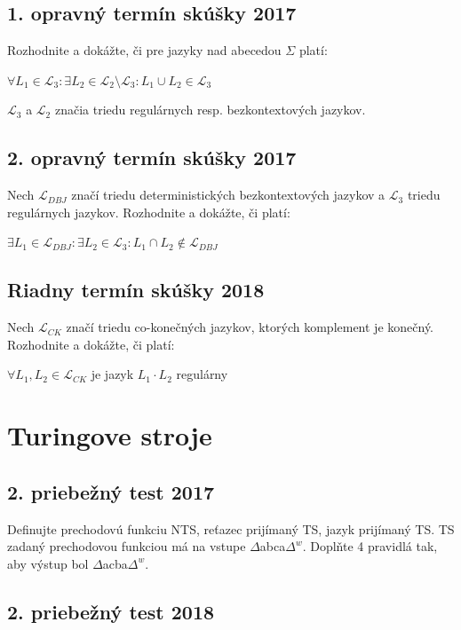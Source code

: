 \documentclass[11pt,a4paper]{article}
\begin{document}
		\subsection{1. opravný termín skúšky 2017}

		Rozhodnite a dokážte, či pre jazyky nad abecedou $\Sigma$ platí:

		$\forall L_1 \in \mathcal{L}_3: \exists L_2 \in \mathcal{L}_2 \setminus \mathcal{L}_3: L_1 \cup L_2 \in \mathcal{L}_3$

		$\mathcal{L}_3$ a $\mathcal{L}_2$ značia triedu regulárnych resp. bezkontextových jazykov.

		\subsection{2. opravný termín skúšky 2017}

		Nech $\mathcal{L}_{DBJ}$ značí triedu deterministických bezkontextových jazykov a $\mathcal{L}_{3}$ triedu regulárnych jazykov. Rozhodnite a dokážte, či platí:

		$\exists L_1 \in \mathcal{L}_{DBJ}: \exists L_2 \in \mathcal{L}_{3}: L_1 \cap L_2 \notin \mathcal{L}_{DBJ}$

		\subsection{Riadny termín skúšky 2018}

		Nech $\mathcal{L}_{CK}$ značí triedu co-konečných jazykov, ktorých komplement je konečný. Rozhodnite a dokážte, či platí:

		$\forall L_1, L_2 \in \mathcal{L}_{CK}$ je jazyk $L_1 \cdot L_2$ regulárny

	\section{Turingove stroje}

		\subsection{2. priebežný test 2017}

		Definujte prechodovú funkciu NTS, reťazec prijímaný TS, jazyk prijímaný TS. TS zadaný prechodovou funkciou má na vstupe $\Delta$abca$\Delta^{w}$. Doplňte 4 pravidlá tak, aby výstup bol $\Delta$acba$\Delta^w$.

		\subsection{2. priebežný test 2018}
\end{document}

